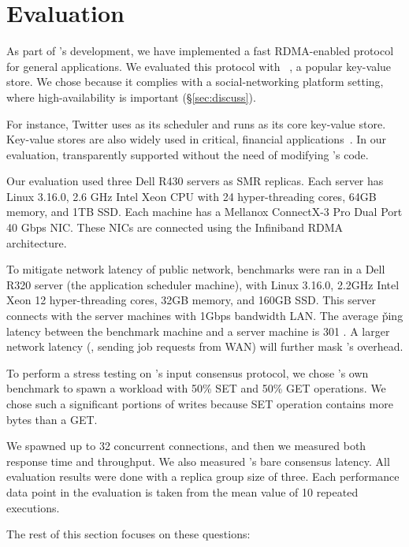 \section{Evaluation} \label{sec:eval}

As part of \xxx's development, we have implemented a fast RDMA-enabled \paxos 
protocol~\cite{falcon:github} for general applications. We evaluated this 
protocol with \redis~\cite{redis}, a popular key-value store. We chose \redis 
because it complies with a social-networking platform setting, where 
high-availability is important (\S\ref{sec:discuss}).

For instance, Twitter uses \mesos as its scheduler and runs \redis as its core 
key-value store. Key-value stores are also widely used in critical, financial 
applications~\cite{nosql:finance,nosql:racs14}. In our evaluation, \xxx 
transparently supported \redis without the need of modifying \redis's code. 

Our evaluation used three Dell R430 servers as SMR replicas. Each server has 
Linux 3.16.0, 2.6 GHz Intel Xeon CPU with 24 hyper-threading cores, 64GB 
memory, and 1TB SSD. Each machine has a Mellanox ConnectX-3 Pro Dual Port 40 
Gbps NIC. These NICs are connected using the Infiniband RDMA architecture.

To mitigate network latency of public network, benchmarks were ran 
in a Dell R320 server (the application scheduler machine), with Linux 3.16.0, 
2.2GHz Intel Xeon 12 hyper-threading cores, 32GB memory, and 160GB SSD. This 
server connects with the server machines with 1Gbps bandwidth LAN. The average 
\v{ping} latency between the benchmark machine and a server machine is 301 \us. 
A larger network latency (\eg, sending job requests from WAN) will further 
mask \xxx's overhead.

To perform a stress testing on \xxx's input consensus protocol, we chose 
\redis's own benchmark to spawn a workload with 50\% SET and 50\% GET 
operations. We chose such a significant portions of writes because SET 
operation contains more bytes than a GET.

We spawned up to 32 concurrent connections, and then we measured both response 
time and throughput. We also measured \xxx's bare consensus latency. All 
evaluation results were done with a replica group size of three. Each 
performance data point in the evaluation is taken from the mean value of 10 
repeated executions.

The rest of this section focuses on these questions:

